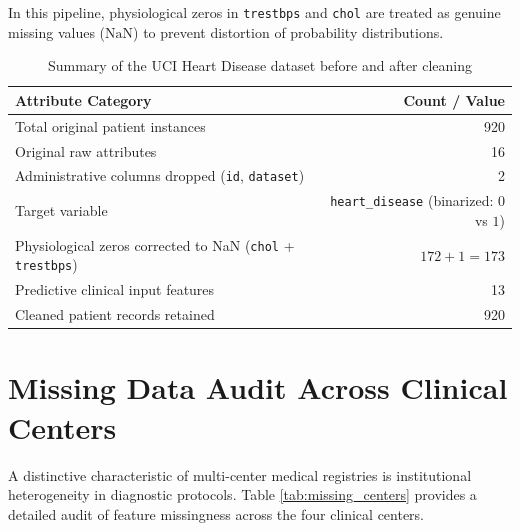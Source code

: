 \documentclass[12pt,a4paper]{report}
\begin{document}
In this pipeline, physiological zeros in \texttt{trestbps} and \texttt{chol} are treated as genuine missing values ($\text{NaN}$) to prevent distortion of probability distributions.

\begin{table}[!htbp]
\centering
\caption{Summary of the UCI Heart Disease dataset before and after cleaning}
\begin{tabular}{lr}
\toprule
\textbf{Attribute Category} & \textbf{Count / Value} \\
\midrule
Total original patient instances & 920 \\
Original raw attributes & 16 \\
Administrative columns dropped (\texttt{id}, \texttt{dataset}) & 2 \\
Target variable & \texttt{heart\_disease} (binarized: $0$ vs $1$) \\
Physiological zeros corrected to NaN (\texttt{chol} + \texttt{trestbps}) & $172 + 1 = 173$ \\
Predictive clinical input features & 13 \\
Cleaned patient records retained & 920 \\
\bottomrule
\end{tabular}
\label{tab:dataset_summary}
\end{table}

\section{Missing Data Audit Across Clinical Centers}

A distinctive characteristic of multi-center medical registries is institutional heterogeneity in diagnostic protocols. Table \ref{tab:missing_centers} provides a detailed audit of feature missingness across the four clinical centers.

\begin{table}[!htbp]
\centering
\caption{Missingness audit across the four participating clinical centers}
\label{tab:missing_centers}
\end{table}
\end{document}

